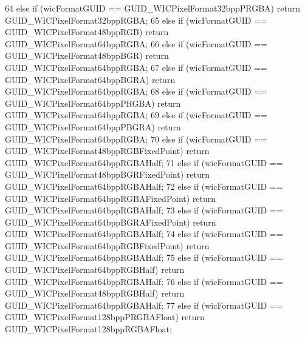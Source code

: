 \begin{DoxyCode}
64     \textcolor{keywordflow}{else} \textcolor{keywordflow}{if} (wicFormatGUID == GUID\_WICPixelFormat32bppPRGBA) \textcolor{keywordflow}{return} GUID\_WICPixelFormat32bppRGBA;
65     \textcolor{keywordflow}{else} \textcolor{keywordflow}{if} (wicFormatGUID == GUID\_WICPixelFormat48bppRGB) \textcolor{keywordflow}{return} GUID\_WICPixelFormat64bppRGBA;
66     \textcolor{keywordflow}{else} \textcolor{keywordflow}{if} (wicFormatGUID == GUID\_WICPixelFormat48bppBGR) \textcolor{keywordflow}{return} GUID\_WICPixelFormat64bppRGBA;
67     \textcolor{keywordflow}{else} \textcolor{keywordflow}{if} (wicFormatGUID == GUID\_WICPixelFormat64bppBGRA) \textcolor{keywordflow}{return} GUID\_WICPixelFormat64bppRGBA;
68     \textcolor{keywordflow}{else} \textcolor{keywordflow}{if} (wicFormatGUID == GUID\_WICPixelFormat64bppPRGBA) \textcolor{keywordflow}{return} GUID\_WICPixelFormat64bppRGBA;
69     \textcolor{keywordflow}{else} \textcolor{keywordflow}{if} (wicFormatGUID == GUID\_WICPixelFormat64bppPBGRA) \textcolor{keywordflow}{return} GUID\_WICPixelFormat64bppRGBA;
70     \textcolor{keywordflow}{else} \textcolor{keywordflow}{if} (wicFormatGUID == GUID\_WICPixelFormat48bppRGBFixedPoint) \textcolor{keywordflow}{return} 
      GUID\_WICPixelFormat64bppRGBAHalf;
71     \textcolor{keywordflow}{else} \textcolor{keywordflow}{if} (wicFormatGUID == GUID\_WICPixelFormat48bppBGRFixedPoint) \textcolor{keywordflow}{return} 
      GUID\_WICPixelFormat64bppRGBAHalf;
72     \textcolor{keywordflow}{else} \textcolor{keywordflow}{if} (wicFormatGUID == GUID\_WICPixelFormat64bppRGBAFixedPoint) \textcolor{keywordflow}{return} 
      GUID\_WICPixelFormat64bppRGBAHalf;
73     \textcolor{keywordflow}{else} \textcolor{keywordflow}{if} (wicFormatGUID == GUID\_WICPixelFormat64bppBGRAFixedPoint) \textcolor{keywordflow}{return} 
      GUID\_WICPixelFormat64bppRGBAHalf;
74     \textcolor{keywordflow}{else} \textcolor{keywordflow}{if} (wicFormatGUID == GUID\_WICPixelFormat64bppRGBFixedPoint) \textcolor{keywordflow}{return} 
      GUID\_WICPixelFormat64bppRGBAHalf;
75     \textcolor{keywordflow}{else} \textcolor{keywordflow}{if} (wicFormatGUID == GUID\_WICPixelFormat64bppRGBHalf) \textcolor{keywordflow}{return} GUID\_WICPixelFormat64bppRGBAHalf;
76     \textcolor{keywordflow}{else} \textcolor{keywordflow}{if} (wicFormatGUID == GUID\_WICPixelFormat48bppRGBHalf) \textcolor{keywordflow}{return} GUID\_WICPixelFormat64bppRGBAHalf;
77     \textcolor{keywordflow}{else} \textcolor{keywordflow}{if} (wicFormatGUID == GUID\_WICPixelFormat128bppPRGBAFloat) \textcolor{keywordflow}{return} 
      GUID\_WICPixelFormat128bppRGBAFloat;

\end{DoxyCode}
